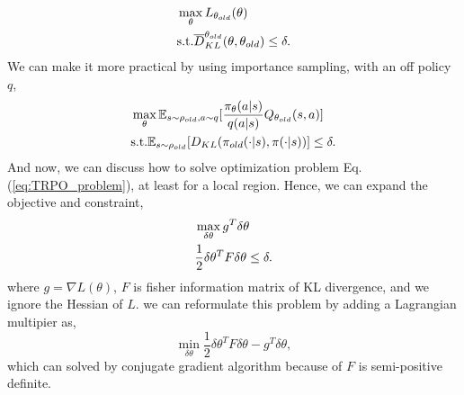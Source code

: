 \documentclass[11pt,a4paper]{article}
\def\bar{\overline}
\def\E{\mathbb{E}}
\begin{document}
\begin{equation}
\label{eq:TRPO_problem}
\aligned 
& \max_{\theta}L_{\theta_{old}}(\theta) \\ 
& \mathrm{s.t.} \bar{D}_{KL}^{\theta_{old}}(\theta,\theta_{old}) \le \delta.
\endaligned 
\end{equation}
We can make it more practical by using importance sampling, with an off policy $q$, 
\begin{equation}
\aligned 
& \max_{\theta} \E_{s\sim \rho_{old}, a\sim q}[\frac{\pi_{\theta}(a|s)}{q(a|s)}Q_{\theta_{old}}(s,a)] \\ 
& \mathrm{s.t.} \E_{s\sim \rho_{old}}[D_{KL}(\pi_{old}(\cdot|s), \pi(\cdot|s))] \le \delta.
\endaligned
\end{equation}
And now, we can discuss how to solve optimization problem Eq.(\ref{eq:TRPO_problem}), at least for a local region. Hence, we can expand the objective and constraint,
\begin{equation}
\aligned 
    & \max_{\delta\theta} g^T \delta\theta \\ 
    & \frac{1}{2}\delta\theta^T F \delta\theta \le \delta. 
\endaligned
\end{equation}
where $g = \nabla L(\theta)$, $F$ is fisher information matrix of KL divergence, and we ignore the Hessian of $L$. we can reformulate this problem by adding a Lagrangian multipier as, 
\begin{equation}
\min_{\delta \theta} \frac{1}{2}\delta\theta^T F \delta\theta - g^T\delta\theta,
\end{equation}
which can solved by conjugate gradient algorithm because of $F$ is semi-positive definite.





\end{document}
